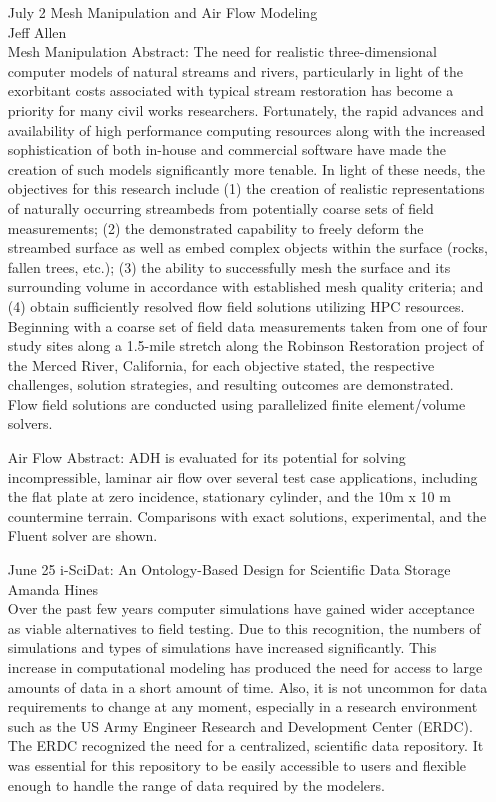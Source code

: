 \documentclass[12]{article}
\begin{document}
\begin{enumerate}
\item[July 2] Mesh Manipulation and Air Flow Modeling\\
  Jeff Allen\\
  Mesh Manipulation Abstract: The need for realistic three-dimensional
  computer models of natural streams and rivers, particularly in light
  of the exorbitant costs associated with typical stream restoration
  has become a priority for many civil works researchers.
  Fortunately, the rapid advances and availability of high performance
  computing resources along with the increased sophistication of both
  in-house and commercial software have made the creation of such
  models significantly more tenable. In light of these needs, the
  objectives for this research include (1) the creation of realistic
  representations of naturally occurring streambeds from potentially
  coarse sets of field measurements; (2) the demonstrated capability
  to freely deform the streambed surface as well as embed complex
  objects within the surface (rocks, fallen trees, etc.); (3) the
  ability to successfully mesh the surface and its surrounding volume
  in accordance with established mesh quality criteria; and (4) obtain
  sufficiently resolved flow field solutions utilizing HPC resources.
  Beginning with a coarse set of field data measurements taken from
  one of four study sites along a 1.5-mile stretch along the Robinson
  Restoration project of the Merced River, California, for each
  objective stated, the respective challenges, solution strategies,
  and resulting outcomes are demonstrated. Flow field solutions are
  conducted using parallelized finite element/volume solvers.

  Air Flow Abstract: ADH is evaluated for its potential for solving
  incompressible, laminar air flow over several test case
  applications, including the flat plate at zero incidence, stationary
  cylinder, and the 10m x 10 m countermine terrain.  Comparisons with
  exact solutions, experimental, and the Fluent solver are shown.

\item[June 25] i-SciDat: An Ontology-Based Design for Scientific Data
  Storage \\
  Amanda Hines \\
  Over the past few years computer simulations have gained wider
  acceptance as viable alternatives to field testing. Due to this
  recognition, the numbers of simulations and types of simulations
  have increased significantly. This increase in computational
  modeling has produced the need for access to large amounts of data
  in a short amount of time. Also, it is not uncommon for data
  requirements to change at any moment, especially in a research
  environment such as the US Army Engineer Research and Development
  Center (ERDC). The ERDC recognized the need for a centralized,
  scientific data repository. It was essential for this repository to
  be easily accessible to users and flexible enough to handle the
  range of data required by the modelers.


\end{enumerate}
\end{document}
